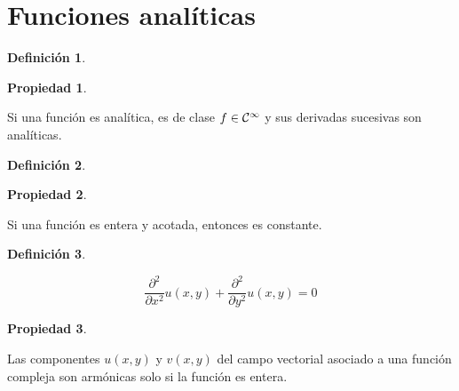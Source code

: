 \documentclass[a5paper,12pt,twoside]{book}
\newtheorem{defn}{{Definición}}[chapter]
\newtheorem{prop}{{Propiedad}}[chapter]
\begin{document}
\section{Funciones analíticas}

\begin{mdframed}[style=MyFrame1]
    \begin{defn}
    \end{defn}
\end{mdframed}

\begin{mdframed}[style=MyFrame1]
    \begin{prop}
    \end{prop}
    Si una función es analítica, es de clase $f \in \class[\infty]$ y sus derivadas sucesivas son analíticas.
\end{mdframed}

\begin{mdframed}[style=MyFrame1]
    \begin{defn}
    \end{defn}
\end{mdframed}

\begin{mdframed}[style=MyFrame1]
    \begin{prop}
    \end{prop}
    Si una función es entera y acotada, entonces es constante.
\end{mdframed}

\begin{mdframed}[style=MyFrame1]
    \begin{defn}
    \end{defn}
    \begin{equation*}
        \frac{\partial^2}{\partial x^2} u(x,y) + \frac{\partial^2}{\partial y^2} u(x,y) = 0
    \end{equation*}
\end{mdframed}

\begin{mdframed}[style=MyFrame1]
    \begin{prop}
    \end{prop}
    Las componentes $u(x,y)$ y $v(x,y)$ del campo vectorial asociado a una función compleja son armónicas solo si la función es entera.
\end{mdframed}
\end{document}
